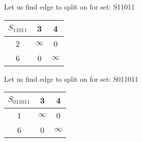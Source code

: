\documentclass[a4paper,10pt]{report} %
\begin{document}
\newpage




Let us find edge to split on for set: S11011\\
\begin{flushleft}\begin{tabular}[]{|c|c|c|}
\hline
$S_{11011 }$& 3 & 4\\
\hline
2 & $\infty$ &      0\\
\hline
6 &      0 & $\infty$\\
\hline
\end{tabular}
\end{flushleft}



\newpage


Let us find edge to split on for set: S011011\\
\begin{flushleft}\begin{tabular}[]{|c|c|c|}
\hline
$S_{011011 }$& 3 & 4\\
\hline
1 & $\infty$ &      0\\
\hline
6 &      0 & $\infty$\\
\hline
\end{tabular}
\end{flushleft}



\newpage
\end{document}
